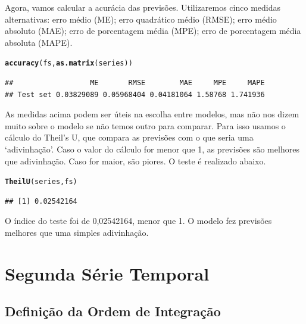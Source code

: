 \documentclass{article}\usepackage[]{graphicx}\usepackage[]{color}
\makeatletter
\newcommand{\hlstd}[1]{\textcolor[rgb]{0.345,0.345,0.345}{#1}}%
\newcommand{\hlkwd}[1]{\textcolor[rgb]{0.737,0.353,0.396}{\textbf{#1}}}%
\newenvironment{kframe}{%
 \def\at@end@of@kframe{}%
 \ifinner\ifhmode%
  \def\at@end@of@kframe{\end{minipage}}%
  \begin{minipage}{\columnwidth}%
 \fi\fi%
 \def\FrameCommand##1{\hskip\@totalleftmargin \hskip-\fboxsep
 \colorbox{shadecolor}{##1}\hskip-\fboxsep
     \hskip-\linewidth \hskip-\@totalleftmargin \hskip\columnwidth}%
 \MakeFramed {\advance\hsize-\width
   \@totalleftmargin\z@ \linewidth\hsize
   \@setminipage}}%
 {\par\unskip\endMakeFramed%
 \at@end@of@kframe}
\newenvironment{knitrout}{}{} %
\makeatother
\begin{document}
            Agora, vamos calcular a acurácia das previsões. Utilizaremos cinco medidas alternativas: erro médio (ME); erro quadrático médio (RMSE); erro médio absoluto (MAE); erro de porcentagem média (MPE); erro de porcentagem média absoluta (MAPE).
        
\begin{knitrout}
\color{fgcolor}\begin{kframe}
\begin{alltt}
\hlkwd{accuracy}\hlstd{(fs,}\hlkwd{as.matrix}\hlstd{(series))}
\end{alltt}
\begin{verbatim}
##                  ME       RMSE        MAE     MPE     MAPE
## Test set 0.03829089 0.05968404 0.04181064 1.58768 1.741936
\end{verbatim}
\end{kframe}
\end{knitrout}

          As medidas acima podem ser úteis na escolha entre modelos, mas não nos dizem muito sobre o modelo se não temos outro para comparar. Para isso usamos o cálculo do Theil's U, que compara as previsões com o que seria uma `adivinhação'. Caso o valor do cálculo for menor que 1, as previsões são melhores que adivinhação. Caso for maior, são piores. O teste é realizado abaixo.
            
\begin{knitrout}
\color{fgcolor}\begin{kframe}
\begin{alltt}
\hlkwd{TheilU}\hlstd{(series,fs)}
\end{alltt}
\begin{verbatim}
## [1] 0.02542164
\end{verbatim}
\end{kframe}
\end{knitrout}
        
          O índice do teste foi de 0,02542164, menor que 1. O modelo fez previsões melhores que uma simples adivinhação.
        



\section{Segunda Série Temporal}

    \subsection{Definição da Ordem de Integração}
    
\end{document}
